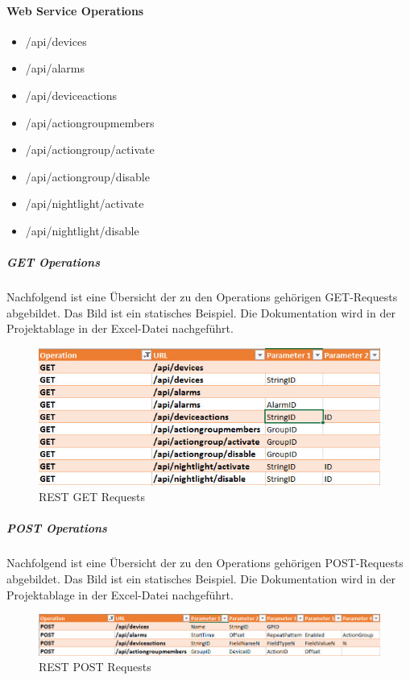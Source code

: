 \documentclass[]{article}
\providecommand{\tightlist}{%
  \setlength{\itemsep}{0pt}\setlength{\parskip}{0pt}}
\let\oldparagraph\paragraph
\renewcommand{\paragraph}[1]{\oldparagraph{#1}\mbox{}}
\let\oldsubparagraph\subparagraph
\renewcommand{\subparagraph}[1]{\oldsubparagraph{#1}\mbox{}}
\begin{document}
\paragraph{Web Service Operations}\label{web-service-operations-1}

\begin{itemize}
\tightlist
\item
  /api/devices
\item
  /api/alarms
\item
  /api/deviceactions
\item
  /api/actiongroupmembers
\item
  /api/actiongroup/activate
\item
  /api/actiongroup/disable
\item
  /api/nightlight/activate
\item
  /api/nightlight/disable
\end{itemize}

\subparagraph{GET Operations}\label{get-operations}

Nachfolgend ist eine Übersicht der zu den Operations gehörigen
GET-Requests abgebildet. Das Bild ist ein statisches Beispiel. Die
Dokumentation wird in der Projektablage in der Excel-Datei nachgeführt.
\begin{figure}[H]
\centering
\includegraphics{./WI27_WebService_Definition_GET.jpeg}
\caption{REST GET Requests}
\end{figure}


\subparagraph{POST Operations}\label{post-operations}

Nachfolgend ist eine Übersicht der zu den Operations gehörigen
POST-Requests abgebildet. Das Bild ist ein statisches Beispiel. Die
Dokumentation wird in der Projektablage in der Excel-Datei nachgeführt.
\begin{figure}[H]
\centering
\includegraphics{./WI27_WebService_Definition_POST.jpeg}
\caption{REST POST Requests}
\end{figure}
\end{document}
